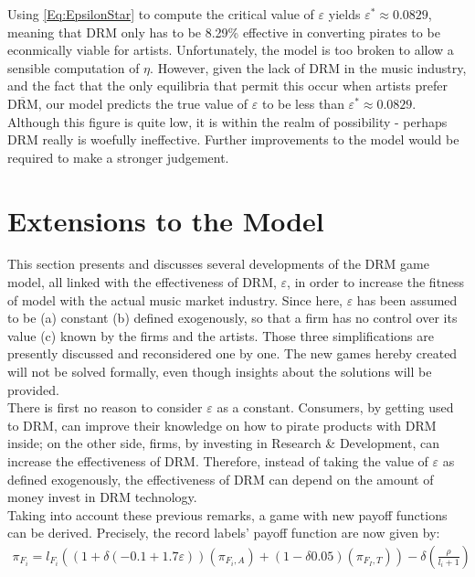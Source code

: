 \documentclass[a4paper,12pt]{article}
\numberwithin{equation}{section}
\newcommand{\drm}{\text{DRM}}
\newcommand{\nodrm}{\overline{\drm}}
\begin{document}
Using \eqref{Eq:EpsilonStar} to compute the critical value of $\varepsilon$ yields $\varepsilon^* \approx 0.0829$, meaning that DRM only has to be 8.29\% effective in converting pirates to be econmically viable for artists. Unfortunately, the model is too broken to allow a sensible computation of $\eta$. However, given the lack of DRM in the music industry, and the fact that the only equilibria that permit this occur when artists prefer $\nodrm$, our model predicts the true value of $\varepsilon$ to be less than $\varepsilon^* \approx 0.0829$. Although this figure is quite low, it is within the realm of possibility - perhaps DRM really is woefully ineffective. Further improvements to the model would be required to make a stronger judgement.

\section{Extensions to the Model} \label{Sec:Extensions}

This section presents and discusses several developments of the DRM
game model, all linked with the effectiveness of DRM, $\varepsilon$,
in order to increase the fitness of model with the actual music market
industry. Since here, $\varepsilon$ has been assumed to be (a) constant
(b) defined exogenously, so that a firm has no control over its value
(c) known by the firms and the artists. Those three simplifications
are presently discussed and reconsidered one by one. The new games
hereby created will not be solved formally, even though insights about
the solutions will be provided.\\

There is first no reason to consider $\varepsilon$ as a constant.
Consumers, by getting used to DRM, can improve their knowledge on
how to pirate products with DRM inside; on the other side, firms,
by investing in Research \& Development, can increase the effectiveness
of DRM. Therefore, instead of taking the value of $\varepsilon$ as
defined exogenously, the effectiveness of DRM can depend on the amount
of money invest in DRM technology.\\

Taking into account these previous remarks, a game with new payoff
functions can be derived. Precisely, the record labels’ payoff function
are now given by:
\begin{eqnarray*}
\pi_{F_{i}}=l_{F_{i}}((1+\delta(-0.1+1.7\varepsilon))(\pi_{F_{i},A})+(1-\delta0.05)(\pi_{F_{I},T}))-\delta(\frac{\rho}{l_{i}+1})
\end{eqnarray*}
\end{document}
